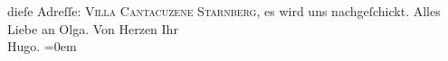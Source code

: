 \begin{ledgroupsized}[t]{13cm}
                  {\pb}dieſe Adreſſe: \textsc{Villa Cantacuzene Starnberg}, es wird uns nachgeſchickt.\pend
           \pstart
           Alles Liebe an Olga.\pend
           \pstart
           Von Herzen Ihr{\\[\baselineskip]}\spacefill\mbox{Hugo.}\pend
           \leftskip=0em{}
         
         \endnumbering{}\end{ledgroupsized}  \newcommand{\dateiname}{L01844}\newcommand{\titel}{Hugo von Hofmannsthal an Arthur Schnitzler, [11. 6. 1909]}\newcommand{\editorInnen}{Martin Anton Müller und Gerd-Hermann Susen}
      